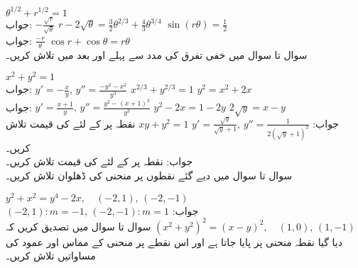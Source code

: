 $\theta^{1/2}+r^{1/2}=1$\\
جواب:\quad
$-\tfrac{\sqrt{r}}{\sqrt{\theta}}$
$r-2\sqrt{\theta}=\tfrac{3}{2}\theta^{2/3}+\tfrac{4}{3}\theta^{3/4}$
$\sin(r\theta)=\tfrac{1}{2}$\\
جواب:\quad
$\tfrac{-r}{\theta}$
$\cos r+\cos \theta=r\theta$
\\
سوال  تا سوال  میں خفی تفرق کی مدد سے  پہلے  اور بعد میں
  تلاش کریں۔

$x^2+y^2=1$\\
جواب:\quad
$y'=-\tfrac{x}{y},\,y''=\tfrac{-y^2-x^2}{y^3}$
$x^{2/3}+y^{2/3}=1$
$y^2=x^2+2x$\\
جواب:\quad
$y'=\tfrac{x+1}{y},\,y''=\tfrac{y^2-(x+1)^2}{y^3}$
$y^2-2x=1-2y$
$2\sqrt{y}=x-y$\\
جواب:\quad
$y'=\tfrac{\sqrt{y}}{\sqrt{y}+1},\,y''=\tfrac{1}{2(\sqrt{y}+1)^3}$
$xy+y^2=1$
نقطہ  پر  کے لئے  کی قیمت تلاش کریں۔\\
جواب:\quad
{}
نقطہ  پر  کے لئے  کی قیمت تلاش کریں۔
\\
سوال  تا سوال  میں دیے گئے نقطوں پر منحنی کی ڈھلوان تلاش کریں۔ 

$y^2+x^2=y^4-2x,\quad (-2,1),\, (-2,-1)$\\
جواب:\quad
$(-2,1):m=-1,\, (-2,-1):m=1$
$(x^2+y^2)^2=(x-y)^2,\quad (1,0),\, (1,-1)$
سوال  تا سوال  میں تصدیق کریں کہ دیا گیا نقطہ منحنی پر پایا جاتا ہے اور اس نقطے پر منحنی کے مماس اور عمود کی مساواتیں تلاش کریں۔

